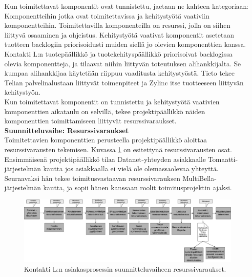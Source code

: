 \documentclass[finnish,12pt,a4paper,pdftex]{article}
\begin{document}
Kun toimitettavat komponentit ovat tunnistettu, jaetaan ne kahteen kategoriaan: Komponentteihin jotka ovat toimitettavissa ja kehitystyötä vaativiin komponentteihin. Toimitettavilla komponenteilla on resurssi, jolla on siihen liittyvä osaaminen ja ohjeistus. Kehitystyötä vaativat komponentit asetetaan tuotteen backlogiin priorisoidusti muiden siellä jo olevien komponenttien kanssa.\\

\noindent Kontakti L:n tuotepäällikkö ja tuotekehityspäällikkö priorisoivat backlogissa olevia komponentteja, ja tilaavat niihin liittyvän toteutuksen alihankkijalta. Se kumpaa alihankkijaa käytetään riippuu vaaditusta kehitystyöstä. Tieto tekee Telian palvelinalustaan liittyvät toimenpiteet ja Zylinc itse tuotteeseen liittyvän kehitystyön.\\

\noindent Kun toimitettavat komponentit on tunnistettu ja kehitystyötä vaativien komponenttien aikataulu on selvillä, tekee projektipäällikkö näiden komponenttien toimittamiseen liittyvät resurssivaraukset.\\

\textbf{Suunnitteluvaihe: Resurssivaraukset}\\

\noindent Toimitettavien komponenttien perusteella projektipäällikkö aloittaa resurssivarausten tekemisen. Kuvassa \ref{fig:resurssit} on esitettynä resurssivarausten osat. Ensimmäisenä projektipäällikkö tilaa Datanet-yhteyden asiakkaalle Tomaatti-järjestelmän kautta jos asiakkaalla ei vielä ole olemassaolevaa yhteyttä. Seuraavaksi hän tekee toimitusvastaavan resurssivarauksen MultiBella-järjestelmän kautta, ja sopii hänen kanssaan roolit toimitusprojektin ajaksi.\\

\begin{figure}[!h]
    \centering
    \includegraphics[scale=0.25]{images/resurssivaraukset.pdf}
    \caption{Kontakti L:n asiakasprosessin suunnitteluvaiheen resurssivaraukset.}
    \label{fig:resurssit}
\end{figure}
\end{document}
